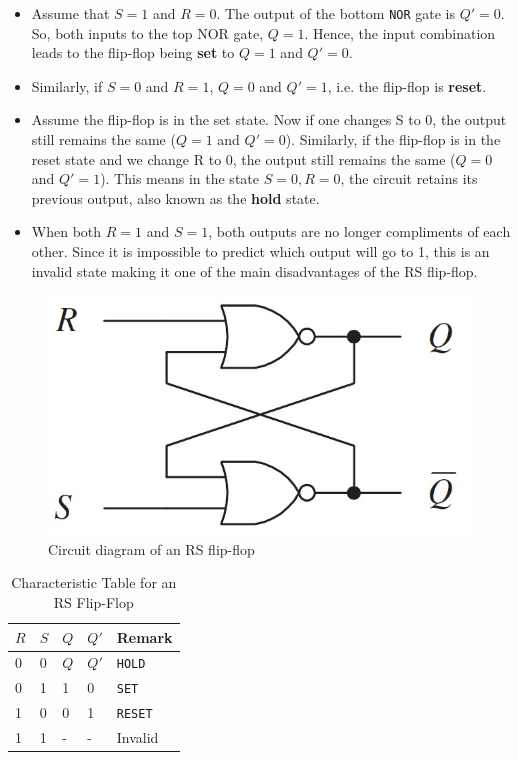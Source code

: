 \begin{itemize}
    \item Assume that $S=1$ and $R=0$. The output of the bottom \verb|NOR| gate is $Q'=0$. So, both inputs to the top NOR gate, $Q=1$. Hence, the input combination leads to the flip-flop being \textbf{set} to $Q=1$ and $Q'=0$.
    \item Similarly, if $S=0$ and $R=1$, $Q=0$ and $Q'=1$, i.e. the flip-flop is \textbf{reset}.
    \item Assume the flip-flop is in the set state. Now if one changes S to 0, the output still remains the same ($Q=1$ and $Q'=0$). Similarly, if the flip-flop is in the reset state and we change R to 0, the output still remains the same ($Q=0$ and $Q'=1$). This means in the state $S=0, R=0$, the circuit retains its previous output, also known as the \textbf{hold} state.
    \item When both $R=1$ and $S=1$, both outputs are no longer compliments of each other. Since it is impossible to predict which output will go to 1, this is an invalid state making it one of the main disadvantages of the RS flip-flop. 
\end{itemize}

\begin{figure}[H]
    \centering
    \includegraphics[width=0.50\columnwidth]{images/rs.jpg}
    \caption{Circuit diagram of an RS flip-flop}
    \label{1}
\end{figure}

\begin{table}[H]
    \centering
    \begin{tabularx}{0.75\columnwidth}{|Y|Y|Y|Y|Y|}\hline
        $R$ & $S$ & $Q$ & $Q'$ & Remark \\  & 0 & $Q$ & $Q'$ & \verb|HOLD| \\ 
        0 & 1 & 1 & 0 & \verb|SET| \\ 
        1 & 0 & 0 & 1 & \verb|RESET| \\ 
        1 & 1 & - & - & Invalid \\ \hline
    \end{tabularx}
    \caption{Characteristic Table for an RS Flip-Flop}
\end{table}

